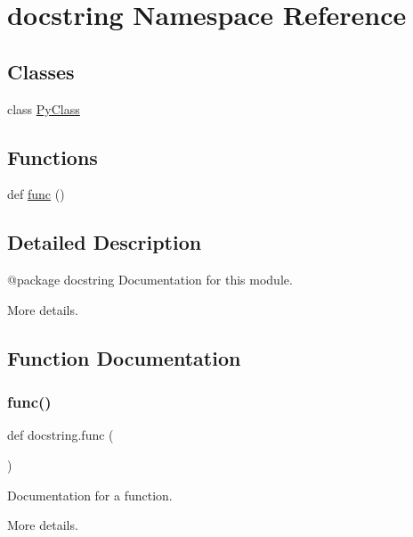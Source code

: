 \hypertarget{namespacedocstring}{}\section{docstring Namespace Reference}
\label{namespacedocstring}
\subsection*{Classes}
\begin{DoxyCompactItemize}
\item 
class \mbox{\hyperlink{classdocstring_1_1_py_class}{Py\+Class}}
\end{DoxyCompactItemize}
\subsection*{Functions}
\begin{DoxyCompactItemize}
\item 
def \mbox{\hyperlink{namespacedocstring_aec1a168f6e16b33f87fe6a37b9208957}{func}} ()
\end{DoxyCompactItemize}


\subsection{Detailed Description}
\begin{DoxyVerb}@package docstring
Documentation for this module.

More details.
\end{DoxyVerb}
 

\subsection{Function Documentation}
\mbox{\label{namespacedocstring_aec1a168f6e16b33f87fe6a37b9208957}} 
\subsubsection{\texorpdfstring{func()}{func()}}
{\footnotesize\ttfamily def docstring.\+func (\begin{DoxyParamCaption}{ }\end{DoxyParamCaption})}

\begin{DoxyVerb}Documentation for a function.

More details.
\end{DoxyVerb}
 

